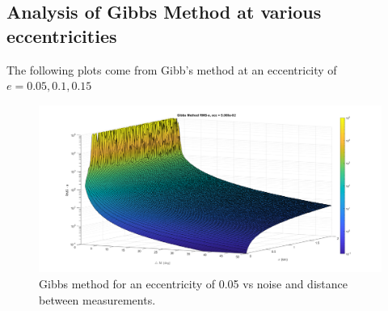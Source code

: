 \documentclass[12pt]{article}
\begin{document}

	
	
	\subsection{Analysis of Gibbs Method at various eccentricities}
	The following plots come from Gibb's method at an eccentricity of $e=0.05,0.1,0.15$
	\begin{figure}[H]
		\centering
		\includegraphics[width=0.7\linewidth]{gibbs_e_05}
		\caption{Gibbs method for an eccentricity of 0.05 vs noise and distance between measurements.}
		\label{fig:gibbse05}
	\end{figure}
\end{document}
